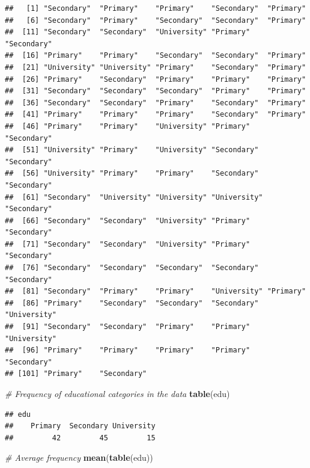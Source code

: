\documentclass[
]{book}
\newenvironment{Shaded}{\begin{snugshade}}{\end{snugshade}}
\newcommand{\CommentTok}[1]{\textcolor[rgb]{0.56,0.35,0.01}{\textit{#1}}}
\newcommand{\FunctionTok}[1]{\textcolor[rgb]{0.13,0.29,0.53}{\textbf{#1}}}
\newcommand{\NormalTok}[1]{#1}
\begin{document}
\begin{verbatim}
##   [1] "Secondary"  "Primary"    "Primary"    "Secondary"  "Primary"   
##   [6] "Secondary"  "Primary"    "Secondary"  "Secondary"  "Primary"   
##  [11] "Secondary"  "Secondary"  "University" "Primary"    "Secondary" 
##  [16] "Primary"    "Primary"    "Secondary"  "Secondary"  "Primary"   
##  [21] "University" "University" "Primary"    "Secondary"  "Primary"   
##  [26] "Primary"    "Secondary"  "Primary"    "Primary"    "Primary"   
##  [31] "Secondary"  "Secondary"  "Secondary"  "Primary"    "Primary"   
##  [36] "Secondary"  "Secondary"  "Primary"    "Secondary"  "Primary"   
##  [41] "Primary"    "Primary"    "Primary"    "Secondary"  "Primary"   
##  [46] "Primary"    "Primary"    "University" "Primary"    "Secondary" 
##  [51] "University" "Primary"    "University" "Secondary"  "Secondary" 
##  [56] "University" "Primary"    "Primary"    "Secondary"  "Secondary" 
##  [61] "Secondary"  "University" "University" "University" "Secondary" 
##  [66] "Secondary"  "Secondary"  "University" "Primary"    "Secondary" 
##  [71] "Secondary"  "Secondary"  "University" "Primary"    "Secondary" 
##  [76] "Secondary"  "Secondary"  "Secondary"  "Secondary"  "Secondary" 
##  [81] "Secondary"  "Primary"    "Primary"    "University" "Primary"   
##  [86] "Primary"    "Secondary"  "Secondary"  "Secondary"  "University"
##  [91] "Secondary"  "Secondary"  "Primary"    "Primary"    "University"
##  [96] "Primary"    "Primary"    "Primary"    "Primary"    "Secondary" 
## [101] "Primary"    "Secondary"
\end{verbatim}

\begin{Shaded}
\begin{Highlighting}[]
\CommentTok{\# Frequency of educational categories in the data}
\FunctionTok{table}\NormalTok{(edu)}
\end{Highlighting}
\end{Shaded}

\begin{verbatim}
## edu
##    Primary  Secondary University 
##         42         45         15
\end{verbatim}

\begin{Shaded}
\begin{Highlighting}[]
\CommentTok{\# Average frequency}
\FunctionTok{mean}\NormalTok{(}\FunctionTok{table}\NormalTok{(edu))}
\end{Highlighting}
\end{Shaded}
\end{document}
